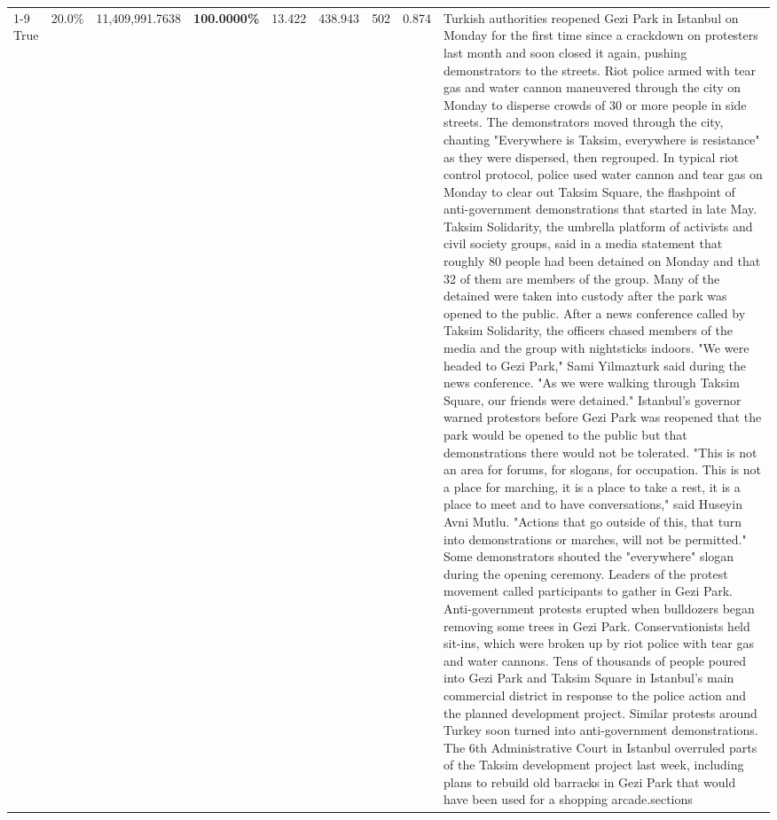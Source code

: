 \begin{table}[H]
\begin{tabular}{lllrlllll}
\cline{1-9}
True & 20.0\% & 11,409,991.7638 & \bfseries \color{red} 100.0000\% & 13.422 & 438.943 & 502 & 0.874 & Turkish authorities reopened Gezi Park in Istanbul on Monday for the first time since a crackdown on protesters last month and soon closed it again, pushing demonstrators to the streets. Riot police armed with tear gas and water cannon maneuvered through the city on Monday to disperse crowds of 30 or more people in side streets. The demonstrators moved through the city, chanting "Everywhere is Taksim, everywhere is resistance" as they were dispersed, then regrouped. In typical riot control protocol, police used water cannon and tear gas on Monday to clear out Taksim Square, the flashpoint of anti-government demonstrations that started in late May. Taksim Solidarity, the umbrella platform of activists and civil society groups, said in a media statement that roughly 80 people had been detained on Monday and that 32 of them are members of the group. Many of the detained were taken into custody after the park was opened to the public. After a news conference called by Taksim Solidarity, the officers chased members of the media and the group with nightsticks indoors. "We were headed to Gezi Park," Sami Yilmazturk said during the news conference. "As we were walking through Taksim Square, our friends were detained." Istanbul's governor warned protestors before Gezi Park was reopened that the park would be opened to the public but that demonstrations there would not be tolerated. "This is not an area for forums, for slogans, for occupation. This is not a place for marching, it is a place to take a rest, it is a place to meet and to have conversations," said Huseyin Avni Mutlu. "Actions that go outside of this, that turn into demonstrations or marches, will not be permitted." Some demonstrators shouted the "everywhere" slogan during the opening ceremony. Leaders of the protest movement called participants to gather in Gezi Park. Anti-government protests erupted when bulldozers began removing some trees in Gezi Park. Conservationists held sit-ins, which were broken up by riot police with tear gas and water cannons. Tens of thousands of people poured into Gezi Park and Taksim Square in Istanbul's main commercial district in response to the police action and the planned development project. Similar protests around Turkey soon turned into anti-government demonstrations. The 6th Administrative Court in Istanbul overruled parts of the Taksim development project last week, including plans to rebuild old barracks in Gezi Park that would have been used for a shopping arcade.sections \\

\end{tabular}
\end{table}
